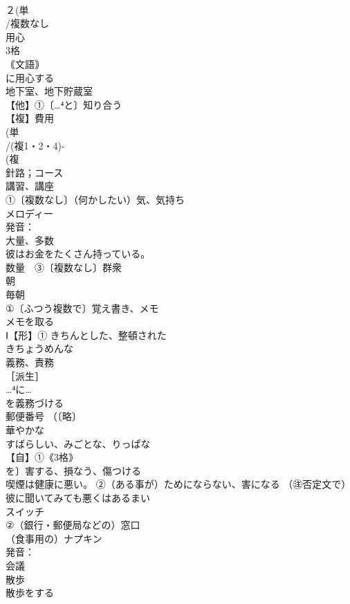 \documentclass[8pt]{extreport}
\begin{document}
\begin{CJK}{UTF8}{min}
\\	２(単
\\	/複数なし　
\\	用心 
\\	3格 
\\	｟文語｠ 
\\	に用心する
\\	地下室、地下貯蔵室 
\\	【他】①〔…⁴と〕知り合う
\\	【複】費用 
\\	(単
\\	/(複1・2・4)-
\\	(複
\\	針路；コース 
\\	講習、講座
\\	①〔複数なし〕（何かしたい）気、気持ち
\\	メロディー 
\\	発音：
\\	大量、多数 
\\	彼はお金をたくさん持っている。 
\\	数量　③〔複数なし〕群衆
\\	朝 
\\	毎朝 
\\	①〔ふつう複数で〕覚え書き、メモ 
\\	メモを取る
\\	Ⅰ【形】① きちんとした、整頓された 
\\	きちょうめんな
\\	義務、責務 
\\	［派生］ 
\\	…⁴に…
\\	を義務づける
\\	郵便番号 （〔略〕
\\	華やかな 
\\	すばらしい、みごとな、りっぱな 
\\	【自】①《3格》
\\	を〕害する、損なう、傷つける 
\\	喫煙は健康に悪い。 ②（ある事が）ためにならない、害になる （㊟否定文で） 
\\	彼に聞いてみても悪くはあるまい
\\	スイッチ 
\\	②（銀行・郵便局などの）窓口
\\	（食事用の）ナプキン 
\\	発音：
\\	会議 
\\	散歩 
\\	散歩をする

\end{CJK}
\end{document}
